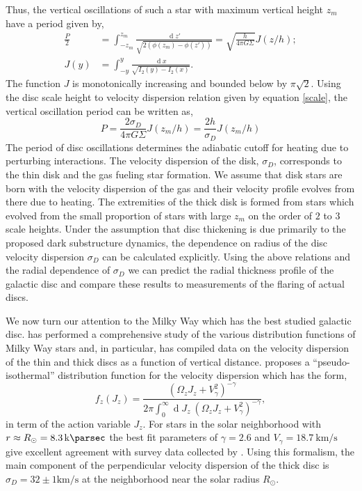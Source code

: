 \documentclass[usenatbib]{mnras}
\renewcommand{\d}[1]{\! \mathrm{d}#1 \:}
\renewcommand{\d}[1]{\ensuremath{\operatorname{d}\!{#1}}}
\begin{document}
Thus, the vertical oscillations of such a star with maximum vertical height $z_m$ have a period given by,
\begin{subequations}
\begin{align}
\frac{P}{2} & = \int_{-z_m}^{z_m} \frac{\d{z'}}{\sqrt{2(\phi(z_m) - \phi(z'))}} = \sqrt{\frac{h}{4 \pi G \Sigma}} J(z / h) ;
\\
J(y) &= \int_{-y}^y \frac{\d{x}}{\sqrt{I_2(y) - I_2(x)}} .
\end{align}
\end{subequations}
The function $J$ is monotonically increasing and bounded below by $\pi \sqrt{2}$. 
Using the disc scale height to velocity dispersion relation given by equation \eqref{scale}, the vertical oscillation period can be written as,
\begin{equation} \label{period}
P = \frac{2 \sigma_D}{4 \pi G \Sigma} J(z_m / h) = \frac{2 h}{\sigma_D} J(z_m / h)
\end{equation}
The period of disc oscillations determines the adiabatic cutoff for heating due to perturbing interactions. The velocity dispersion of the disk, $\sigma_D$, corresponds to the thin disk and the gas fueling star formation. We assume that disk stars are born with the velocity dispersion of the gas and their velocity profile evolves from there due to heating. The extremities of the thick disk is formed from stars which evolved from the small proportion of stars with large $z_m$ on the order of $2$ to $3$ scale heights. Under the assumption that disc thickening is due primarily to the proposed dark substructure dynamics, the dependence on radius of the disc velocity dispersion $\sigma_D$ can be calculated explicitly. Using the above relations and the radial dependence of $\sigma_D$ we can predict the radial thickness profile of the galactic disc and compare these results to measurements of the flaring of actual discs.  
\par
We now turn our attention to the Milky Way which has the best studied galactic disc. \cite{milky_way} has performed a comprehensive study of the various distribution functions of Milky Way stars and, in particular, has compiled data on the velocity dispersion of the thin and thick discs as a function of vertical distance. \cite{milky_way} proposes a ``pseudo-isothermal'' distribution function for the velocity dispersion which has the form,
\begin{equation}
f_z(J_z) = \frac{\left( \Omega_z J_z + V_\gamma^2 \right)^{-\gamma}}{2 \pi \int_{0}^{\infty} \d{J_z} \: \left( \Omega_z J_z + V_\gamma^2 \right)^{-\gamma} },
\end{equation}  
in term of the action variable $J_z$. For stars in the solar neighborhood with $r \approx R_{\odot} =  \SI{8.3}{\kilo \parsec}$ the best fit parameters of $\gamma = 2.6$ and $V_\gamma = \SI{18.7}{\kilo \meter \per \second}$ give excellent agreement with survey data collected by \cite{milkyway-thickdisc}. Using this formalism, the main component of the perpendicular velocity dispersion of the thick disc is $\sigma_D = 32 \pm 1 \si{\kilo \meter \per \second}$ at the neighborhood near the solar radius $R_{\odot}$.   
\end{document}
